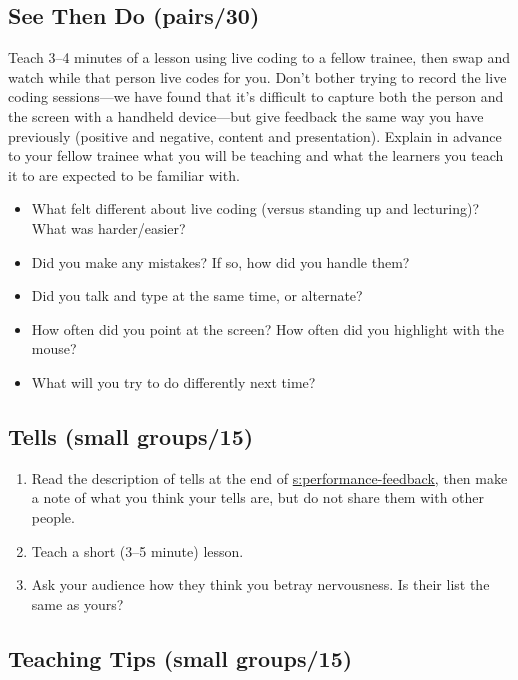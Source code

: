\subsection{See Then Do (pairs/30)}\label{see-then-do-pairs30}

Teach 3--4 minutes of a lesson using live coding to a fellow trainee,
then swap and watch while that person live codes for you. Don't bother
trying to record the live coding sessions---we have found that it's
difficult to capture both the person and the screen with a handheld
device---but give feedback the same way you have previously (positive and
negative, content and presentation). Explain in advance to your fellow
trainee what you will be teaching and what the learners you teach it to
are expected to be familiar with.

\begin{itemize}
\item
  What felt different about live coding (versus standing up and
  lecturing)? What was harder/easier?
\item
  Did you make any mistakes? If so, how did you handle them?
\item
  Did you talk and type at the same time, or alternate?
\item
  How often did you point at the screen? How often did you highlight
  with the mouse?
\item
  What will you try to do differently next time?
\end{itemize}

\subsection{Tells (small groups/15)}\label{tells-small-groups15}

\begin{enumerate}
\item
  Read the description of tells at the end of
  \protect\hyperlink{SECTION}{s:performance-feedback}, then make a note of what you
  think your tells are, but do not share them with other people.
\item
  Teach a short (3--5 minute) lesson.
\item
  Ask your audience how they think you betray nervousness. Is their
  list the same as yours?
\end{enumerate}

\subsection{Teaching Tips (small groups/15)}\label{teaching-tips-small-groups15}

